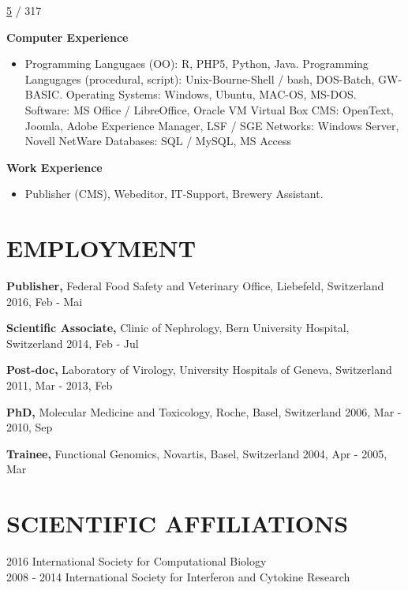 \documentclass{res}
\begin{document}
\begin{resume}
\begin{itemize}
        \href{http://www.researcherid.com/rid/A-8230-2013}{5} / 317
       \end{itemize} 

   {\bf Computer Experience} 
        \begin{itemize}
        \item[] Programming Langugaes (OO): R, PHP5, Python, Java.  
        Programming Langugages (procedural, script): Unix-Bourne-Shell / bash, DOS-Batch, GW-BASIC. 
        Operating Systems: Windows, Ubuntu, MAC-OS, MS-DOS.
        Software: MS Office / LibreOffice, Oracle VM Virtual Box
        CMS: OpenText, Joomla, Adobe Experience Manager, LSF / SGE 
        Networks: Windows Server, Novell NetWare
        Databases: SQL / MySQL, MS Access
        \end{itemize}
        
   {\bf  Work Experience} 
        \begin{itemize}
        \item[]  Publisher (CMS), Webeditor, IT-Support, Brewery Assistant. 
       \end{itemize} 
 
\section{EMPLOYMENT} 
\vspace{0.1in} 
    {\bf Publisher,} Federal Food Safety and Veterinary Office, Liebefeld, Switzerland 
	2016, Feb - Mai
 
    {\bf Scientific Associate,} Clinic of Nephrology, Bern University Hospital, Switzerland  
	2014, Feb - Jul
 
    {\bf Post-doc,} Laboratory of Virology, University Hospitals of Geneva, Switzerland
	2011, Mar - 2013, Feb 
 
    {\bf PhD,} Molecular Medicine and Toxicology, Roche, Basel, Switzerland
	2006, Mar - 2010, Sep
 
    {\bf Trainee,} Functional Genomics, Novartis, Basel, Switzerland
	2004, Apr - 2005, Mar 
 
 
\section{SCIENTIFIC AFFILIATIONS} 
\vspace{0.1in} 
	2016 International Society for Computational Biology \\
    2008 - 2014	International Society for Interferon and Cytokine Research \\
    

\end{resume}
\end{document}
